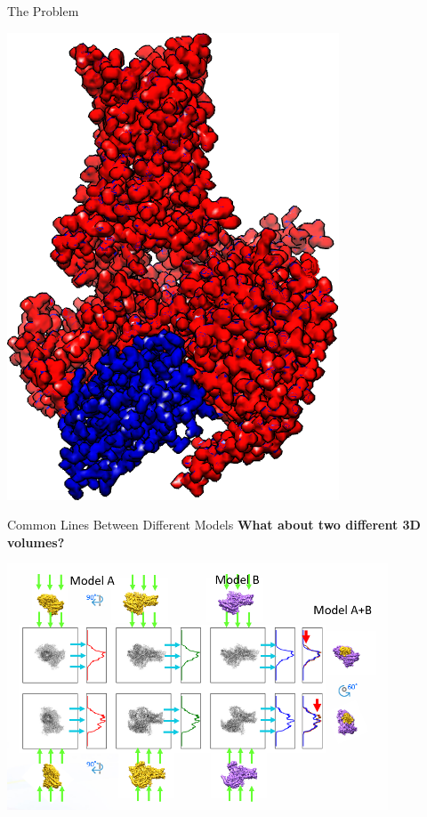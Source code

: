 \documentclass[t, 11pt, xcolor=dvipsnames]{beamer}
\begin{document}
\begin{frame}{The Problem}
\begin{center}
\begin{minipage}{0.45\textwidth}
\begin{center}
        \includegraphics[height=0.4\textheight]{images/figures/all_edit.png}
      \end{center}
    \end{minipage}
  \end{center}
\end{frame}

\begin{frame}[fragile]{Common Lines Between Different Models}
  \centering\textbf{What about two different 3D volumes?}
 \begin{center}\includegraphics[width=0.85\textwidth]{images/lines_two_models.png}
    \end{center}
\end{frame}
\end{document}
